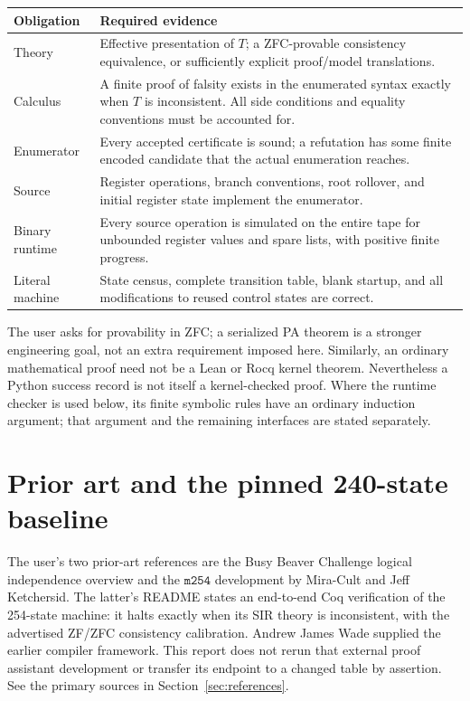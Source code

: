 \documentclass[11pt,a4paper]{article}
\theoremstyle{definition}
\begin{document}
\begin{center}
\begin{tabularx}{\textwidth}{@{}p{}X@{}}
\toprule
Obligation & Required evidence\\
\midrule
Theory & Effective presentation of $T$; a ZFC-provable consistency
equivalence, or sufficiently explicit proof/model translations.\\
Calculus & A finite proof of falsity exists in the enumerated syntax exactly
when $T$ is inconsistent.  All side conditions and equality conventions
must be accounted for.\\
Enumerator & Every accepted certificate is sound; a refutation has some
finite encoded candidate that the actual enumeration reaches.\\
Source & Register operations, branch conventions, root rollover, and
initial register state implement the enumerator.\\
Binary runtime & Every source operation is simulated on the entire tape for
unbounded register values and spare lists, with positive finite progress.\\
Literal machine & State census, complete transition table, blank startup,
and all modifications to reused control states are correct.\\
\bottomrule
\end{tabularx}
\end{center}

The user asks for provability in ZFC; a serialized PA theorem is a stronger
engineering goal, not an extra requirement imposed here.  Similarly, an
ordinary mathematical proof need not be a Lean or Rocq kernel theorem.
Nevertheless a Python success record is not itself a kernel-checked proof.
Where the runtime checker is used below, its finite symbolic rules have an
ordinary induction argument; that argument and the remaining interfaces
are stated separately.

\section{Prior art and the pinned 240-state baseline}
\label{sec:baseline}

The user's two prior-art references are the Busy Beaver Challenge logical
independence overview and the $\mathtt{m254}$ development by Mira-Cult and
Jeff Ketchersid.  The latter's README states an end-to-end Coq verification
of the 254-state machine: it halts exactly when its SIR theory is
inconsistent, with the advertised ZF/ZFC consistency calibration.  Andrew
James Wade supplied the earlier compiler framework.  This report does not
rerun that external proof assistant development or transfer its endpoint
to a changed table by assertion.  See the primary sources in
Section~\ref{sec:references}.
\end{document}
